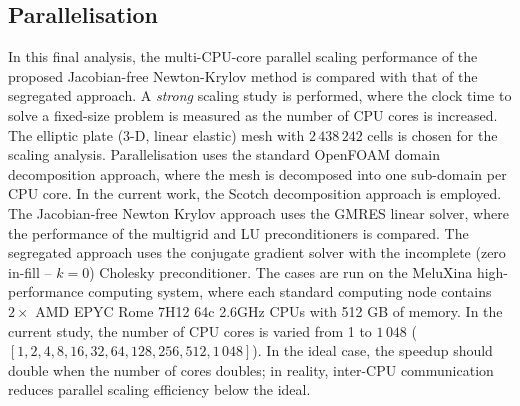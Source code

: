 \documentclass[sn-mathphys,Numbered]{sn-jnl}%
\begin{document}



\subsection{Parallelisation}
\label{sec:parallelisation}
In this final analysis, the multi-CPU-core parallel scaling performance of the proposed Jacobian-free Newton-Krylov method is compared with that of the segregated approach.
A \emph{strong} scaling study is performed, where the clock time to solve a fixed-size problem is measured as the number of CPU cores is increased.
The elliptic plate (3-D, linear elastic) mesh with $2\,438\,242$ cells is chosen for the scaling analysis.
Parallelisation uses the standard OpenFOAM domain decomposition approach, where the mesh is decomposed into one sub-domain per CPU core.
In the current work, the Scotch decomposition approach \citep{Pellegrini2012} is employed.
The Jacobian-free Newton Krylov approach uses the GMRES linear solver, where the performance of the multigrid and LU preconditioners is compared.
The segregated approach uses the conjugate gradient solver with the incomplete (zero in-fill -- $k = 0$) Cholesky preconditioner.
The cases are run on the MeluXina high-performance computing system, where each standard computing node contains $2\times$ AMD EPYC Rome 7H12 64c 2.6GHz CPUs with 512 GB of memory.
In the current study, the number of CPU cores is varied from 1 to $1\,048$ ($\left[ 1, 2, 4, 8, 16, 32, 64, 128, 256, 512, 1\,048 \right]$).
In the ideal case, the speedup should double when the number of cores doubles; in reality, inter-CPU communication reduces parallel scaling efficiency below the ideal.
\end{document}
